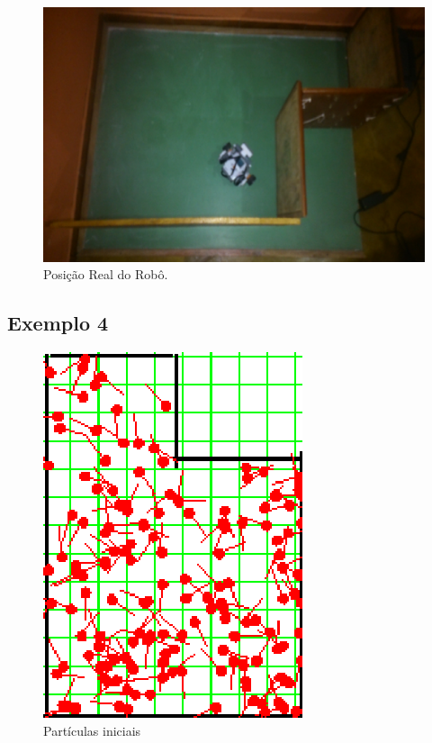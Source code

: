 \begin{figure}[H]
  \centering
  \includegraphics[scale=1]{figuras/cen4_ex3/real.eps}
  \caption[Posição Real do Robô]{Posição Real do Robô.}
  \label{img:cen4_ex3_real}
\end{figure}

\subsection{Exemplo 4}


\begin{figure}[H]
  \centering
  \includegraphics[scale=1]{figuras/cen4_ex4/1.eps}
  \caption[Partículas Iniciais]{Partículas iniciais}
  \label{img:cen4_ex4_1}
\end{figure}

